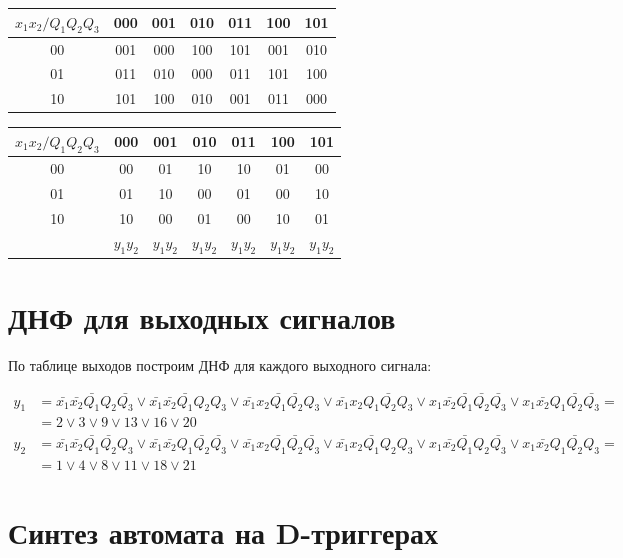 \documentclass[listings]{labreport}
\begin{document}
\begin{tabular}{|*{7}{c|}}
\hline
$x_1x_2/Q_1Q_2Q_3$ & 000 & 001 & 010 & 011 & 100 & 101\\\hline
00 & 001 & 000 & 100 & 101 & 001 & 010\\\hline
01 & 011 & 010 & 000 & 011 & 101 & 100\\\hline
10 & 101 & 100 & 010 & 001 & 011 & 000\\\hline
\end{tabular}

\begin{tabular}{|*{7}{c|}}
\hline
$x_1x_2/Q_1Q_2Q_3$ & 000 & 001 & 010 & 011 & 100 & 101\\\hline
00 & 00 & 01 & 10 & 10 & 01 & 00\\\hline
01 & 01 & 10 & 00 & 01 & 00 & 10\\\hline
10 & 10 & 00 & 01 & 00 & 10 & 01\\\hline
 & $y_1y_2$ & $y_1y_2$ & $y_1y_2$ & $y_1y_2$ & $y_1y_2$ & $y_1y_2$\\\hline
\end{tabular}

\section*{ДНФ для выходных сигналов}

По таблице выходов построим ДНФ для каждого выходного сигнала:

\begin{align*}
y_1 & = \bar{x_1}\bar{x_2}\bar{Q_1}Q_2\bar{Q_3} \lor \bar{x_1}\bar{x_2}\bar{Q_1}Q_2Q_3 \lor \bar{x_1}x_2\bar{Q_1}\bar{Q_2}Q_3 \lor \bar{x_1}x_2Q_1\bar{Q_2}Q_3 \lor x_1\bar{x_2}\bar{Q_1}\bar{Q_2}\bar{Q_3} \lor x_1\bar{x_2}Q_1\bar{Q_2}\bar{Q_3} = \\ & = 2 \lor 3 \lor 9 \lor 13 \lor 16 \lor 20 \\
y_2 & = \bar{x_1}\bar{x_2}\bar{Q_1}\bar{Q_2}Q_3 \lor \bar{x_1}\bar{x_2}Q_1\bar{Q_2}\bar{Q_3} \lor \bar{x_1}x_2\bar{Q_1}\bar{Q_2}\bar{Q_3} \lor \bar{x_1}x_2\bar{Q_1}Q_2Q_3 \lor x_1\bar{x_2}\bar{Q_1}Q_2\bar{Q_3} \lor x_1\bar{x_2}Q_1\bar{Q_2}Q_3 = \\ & = 1 \lor 4 \lor 8 \lor 11 \lor 18 \lor 21
\end{align*}

\section*{Синтез автомата на D-триггерах}
\end{document}
